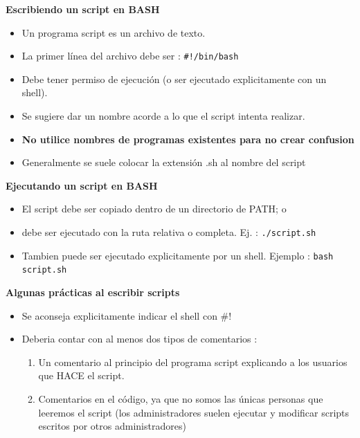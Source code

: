 \documentclass{beamer}
\begin{document}
\begin{frame}{}
\textbf{Escribiendo un script en BASH }
\begin{itemize}
\item Un programa script es un archivo de texto.
\item La primer línea del archivo debe ser : \texttt{\#!/bin/bash}
\item Debe tener permiso de ejecución (o ser ejecutado explicitamente con un shell).
\item Se sugiere dar un nombre acorde a lo que el script intenta realizar.
\item \textbf{No utilice nombres de programas existentes para no crear confusion}
\item Generalmente se suele colocar la extensión .sh al nombre del script
\end{itemize}

\end{frame}

\begin{frame}{}
\textbf{Ejecutando un script en BASH }
\begin{itemize}
\item El script debe ser copiado dentro de un directorio de PATH; o
\item debe ser ejecutado con la ruta relativa o completa. Ej. : \texttt{./script.sh}
\item Tambien puede ser ejecutado explicitamente por un shell. Ejemplo : \texttt{bash script.sh}
\end{itemize}

\end{frame}

\begin{frame}{}
\textbf{Algunas prácticas al escribir scripts }
\begin{itemize}
\item Se aconseja explicitamente indicar el shell con \#!
\item Deberia contar con al menos dos tipos de comentarios :
\begin{enumerate}
\item Un comentario al principio del programa script explicando a los usuarios que HACE el script.
\item Comentarios en el código, ya que no somos las únicas personas que leeremos el script 
(los administradores suelen ejecutar y modificar scripts escritos por otros administradores)
\end{enumerate}
\end{itemize}

\end{frame}
\end{document}
